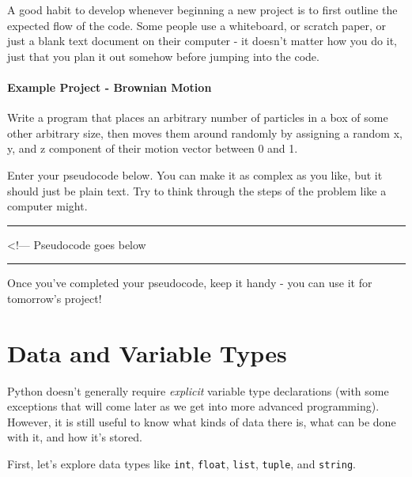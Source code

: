 A good habit to develop whenever beginning a new project is to first
outline the expected flow of the code. Some people use a whiteboard, or
scratch paper, or just a blank text document on their computer - it
doesn't matter how you do it, just that you plan it out somehow before
jumping into the code.

\hypertarget{example-project---brownian-motion}{%
\paragraph{Example Project - Brownian
Motion}\label{example-project---brownian-motion}}

Write a program that places an arbitrary number of particles in a box of
some other arbitrary size, then moves them around randomly by assigning
a random x, y, and z component of their motion vector between 0 and 1.

Enter your pseudocode below. You can make it as complex as you like, but
it should just be plain text. Try to think through the steps of the
problem like a computer might.

\begin{center}\rule{0.5\linewidth}{0.5pt}\end{center}

    \textless!--- Pseudocode goes below

    \begin{center}\rule{0.5\linewidth}{0.5pt}\end{center}

Once you've completed your pseudocode, keep it handy - you can use it
for tomorrow's project!

\section{Data and Variable Types}
Python doesn't generally require \emph{explicit} variable type
declarations (with some exceptions that will come later as we get into
more advanced programming). However, it is still useful to know what
kinds of data there is, what can be done with it, and how it's stored.

First, let's explore data types like \texttt{int}, \texttt{float},
\texttt{list}, \texttt{tuple}, and \texttt{string}.

